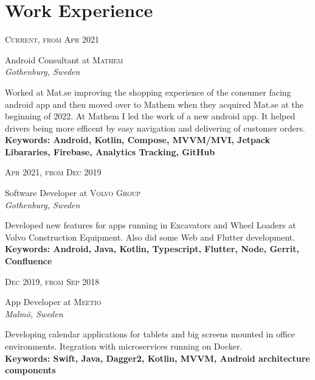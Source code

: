 \documentclass[10pt]{article} %
\begin{document}
{\begin{minipage}[t]{0.5\textwidth}
\section{Work Experience}

{\raggedleft\textsc{Current, from Apr 2021}\par}

{\raggedright\large Android Consultant at \textsc{Mathem}\\
\textit{Gothenburg, Sweden}\\[5pt]}
\normalsize{ 
  Worked at Mat.se improving the shopping experience of the consumer facing android app and then moved over to Mathem when they acquired Mat.se at the beginning of 2022.
  At Mathem I led the work of a new android app. It helped drivers being more efficent by easy navigation and delivering of customer orders.
}\\
\textbf{Keywords: Android, Kotlin, Compose, MVVM/MVI, Jetpack Libararies, Firebase, Analytics Tracking, GitHub }\\


{\raggedleft\textsc{Apr 2021, from Dec 2019}\par}

{\raggedright\large Software Developer at \textsc{Volvo Group}\\
\textit{Gothenburg, Sweden}\\[5pt]}
\normalsize{
  Developed new features for apps running in Excavators and Wheel Loaders at Volvo Construction Equipment. 
  Also did some Web and Flutter development.
}\\
\textbf{Keywords: Android, Java, Kotlin, Typescript, Flutter, Node, Gerrit, Confluence}\\


{\raggedleft\textsc{Dec 2019, from Sep 2018}\par}

{\raggedright\large App Developer at \textsc{Meetio}\\
\textit{Malmö, Sweden}\\[5pt]}
\normalsize{
  Developing calendar applications for tablets and big screens mounted in office environments.
  Itegration with microservices running on Docker.
}\\ 
\textbf{Keywords: Swift, Java, Dagger2, Kotlin, MVVM, Android architecture components }\\


\end{minipage}}
\end{document}
